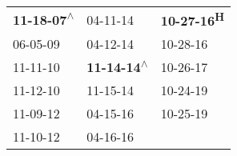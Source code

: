 \begin{supertabular}{lll}
 \textbf{11-18-07\textsuperscript{$\wedge$}} &                   04-11-14\textsuperscript{} &  \textbf{10-27-16\textsuperscript{H}} \\
                  06-05-09\textsuperscript{} &                   04-12-14\textsuperscript{} &            10-28-16\textsuperscript{} \\
                  11-11-10\textsuperscript{} &  \textbf{11-14-14\textsuperscript{$\wedge$}} &            10-26-17\textsuperscript{} \\
                  11-12-10\textsuperscript{} &                   11-15-14\textsuperscript{} &            10-24-19\textsuperscript{} \\
                  11-09-12\textsuperscript{} &                   04-15-16\textsuperscript{} &            10-25-19\textsuperscript{} \\
                  11-10-12\textsuperscript{} &                   04-16-16\textsuperscript{} &                                       \\
\end{supertabular}
